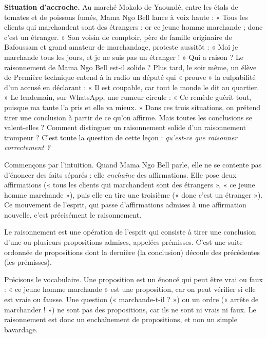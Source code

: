 \documentclass[11pt]{article}
\newcommand{\cle}[1]{{\popxbold\color{popdark}#1}}
\newcounter{popsec}
\newcounter{popsub}
\newcommand{\courssub}[1]{%
  \stepcounter{popsub}%
  \par\vspace{9pt}\noindent{\popxbold\fontsize{11.5}{13}\selectfont\color{popink}{\color{poporange}\thepopsec.\thepopsub}\hspace{6pt}#1}\par\nopagebreak\vspace{4pt}
}
\begin{document}
\textbf{Situation d'accroche.} Au marché Mokolo de Yaoundé, entre les étals de tomates et de poissons fumés, Mama Ngo Bell lance à voix haute : « Tous les clients qui marchandent sont des étrangers ; or ce jeune homme marchande ; donc c'est un étranger. » Son voisin de comptoir, père de famille originaire de Bafoussam et grand amateur de marchandage, proteste aussitôt : « Moi je marchande tous les jours, et je ne suis pas un étranger ! » Qui a raison ? Le raisonnement de Mama Ngo Bell est-il solide ? Plus tard, le soir même, un élève de Première technique entend à la radio un député qui « prouve » la culpabilité d'un accusé en déclarant : « Il est coupable, car tout le monde le dit au quartier. » Le lendemain, sur WhatsApp, une rumeur circule : « Ce remède guérit tout, puisque ma tante l'a pris et elle va mieux. » Dans ces trois situations, on prétend tirer une conclusion à partir de ce qu'on affirme. Mais toutes les conclusions se valent-elles ? Comment distinguer un raisonnement solide d'un raisonnement trompeur ? C'est toute la question de cette leçon : \emph{qu'est-ce que raisonner correctement ?}

\courssub{Définition du raisonnement}

Commençons par l'intuition. Quand Mama Ngo Bell parle, elle ne se contente pas d'énoncer des faits séparés : elle \emph{enchaîne} des affirmations. Elle pose deux affirmations (« tous les clients qui marchandent sont des étrangers », « ce jeune homme marchande »), puis elle en tire une troisième (« donc c'est un étranger »). Ce mouvement de l'esprit, qui passe d'affirmations admises à une affirmation nouvelle, c'est précisément le raisonnement.

\begin{definition}[Le raisonnement]
Le \cle{raisonnement} est une opération de l'esprit qui consiste à tirer une \cle{conclusion} d'une ou plusieurs propositions admises, appelées \cle{prémisses}. C'est une suite ordonnée de propositions dont la dernière (la conclusion) découle des précédentes (les prémisses).
\end{definition}

Précisons le vocabulaire. Une \cle{proposition} est un énoncé qui peut être vrai ou faux : « ce jeune homme marchande » est une proposition, car on peut vérifier si elle est vraie ou fausse. Une question (« marchande-t-il ? ») ou un ordre (« arrête de marchander ! ») ne sont pas des propositions, car ils ne sont ni vrais ni faux. Le raisonnement est donc un enchaînement de propositions, et non un simple bavardage.
\end{document}
